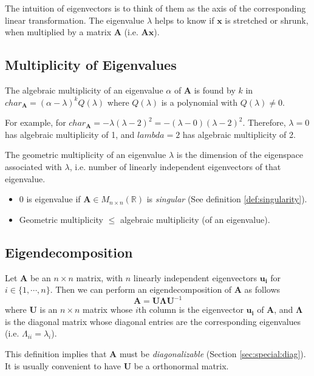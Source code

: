 The intuition of eigenvectors is to think of them as the axis of the corresponding linear transformation. The eigenvalue $\lambda$ helps to know if $\bm{x}$ is stretched or shrunk, when multiplied by a matrix $\bm{A}$ (i.e. $\bm{Ax}$).

\subsection{Multiplicity of Eigenvalues}

\begin{definition}
The algebraic multiplicity of an eigenvalue $\alpha$ of $\bm{A}$ is found by $k$ in $char_{\bm{A}}=(\alpha-\lambda)^kQ(\lambda)$ where $Q(\lambda)$ is a polynomial with $Q(\lambda)\neq 0$.
\end{definition}

For example, for $char_{\bm{A}}=-\lambda(\lambda-2)^2=-(\lambda-0)(\lambda-2)^2$. Therefore, $\lambda=0$ has algebraic multiplicity of 1, and $lambda=2$ has algebraic multiplicity of 2.


\begin{definition}
The geometric multiplicity of an eigenvalue $\lambda$ is the dimension of the eigenspace associated with $\lambda$, i.e. number of linearly independent eigenvectors of that eigenvalue.
\end{definition}
\begin{itemize}
    \item 0 is eigenvalue if $\bm{A}\in M_{n\times n}(\mathbb{R})$ is \emph{singular} (See definition \ref{def:singularity}).
    \item Geometric multiplicity $\leq$ algebraic multiplicity (of an eigenvalue).
\end{itemize}


\subsection{Eigendecomposition}
\begin{definition}
Let $\bm{A}$ be an $n\times n$ matrix, with $n$ linearly independent eigenvectors $\bm{u_i}$ for $i\in\{1,\cdots,n\}$. Then we can perform an eigendecomposition of $\bm{A}$ as follows
\begin{equation}
    \bm{A}=\bm{U\Lambda U}^{-1}
\end{equation}
where $\bm{U}$ is an $n\times n$ matrix whose $i$th column is the eigenvector $\bm{u_i}$ of $\bm{A}$, and $\bm{\Lambda}$ is the diagonal matrix whose diagonal entries are the corresponding eigenvalues (i.e. $\Lambda_{ii}=\lambda_i$).
\end{definition}

This definition implies that $\bm{A}$ must be \emph{diagonalizable} (Section \ref{sec:special:diag}). It is usually convenient to have $\bm{U}$ be a orthonormal matrix.